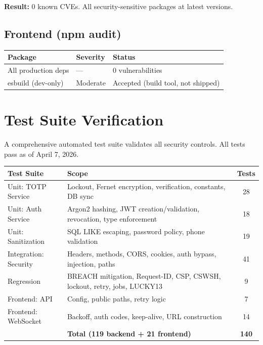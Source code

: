 \documentclass[11pt,a4paper]{article}
\begin{document}
\textbf{Result:} 0 known CVEs. All security-sensitive packages at latest versions.

\subsection{Frontend (npm audit)}

\begin{center}
\begin{tabularx}{\textwidth}{llX}
\toprule
\textbf{Package} & \textbf{Severity} & \textbf{Status} \\
\midrule
All production deps & --- & \textcolor{pass}{0 vulnerabilities} \\
esbuild (dev-only) & Moderate & \textcolor{medium}{Accepted} (build tool, not shipped) \\
\bottomrule
\end{tabularx}
\end{center}

\newpage
\section{Test Suite Verification}

A comprehensive automated test suite validates all security controls. All tests pass as of April 7, 2026.

\begin{center}
\begin{tabular}{llc}
\toprule
\textbf{Test Suite} & \textbf{Scope} & \textbf{Tests} \\
\midrule
Unit: TOTP Service & Lockout, Fernet encryption, verification, constants, DB sync & 28 \\
Unit: Auth Service & Argon2 hashing, JWT creation/validation, revocation, type enforcement & 18 \\
Unit: Sanitization & SQL LIKE escaping, password policy, phone validation & 19 \\
Integration: Security & Headers, methods, CORS, cookies, auth bypass, injection, paths & 41 \\
Regression & BREACH mitigation, Request-ID, CSP, CSWSH, lockout, retry, jobs, LUCKY13 & 9 \\
Frontend: API & Config, public paths, retry logic & 7 \\
Frontend: WebSocket & Backoff, auth codes, keep-alive, URL construction & 14 \\
\midrule
& \textbf{Total (119 backend + 21 frontend)} & \textbf{140} \\
\bottomrule
\end{tabular}
\end{center}
\end{document}
